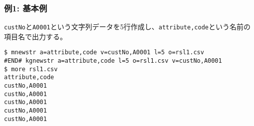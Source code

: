 \subsubsection*{例1: 基本例}

\verb|custNo|と\verb|A0001|という文字列データを5行作成し、\verb|attribute,code|という名前の項目名で出力する。


\begin{Verbatim}[baselinestretch=0.7,frame=single]
$ mnewstr a=attribute,code v=custNo,A0001 l=5 o=rsl1.csv
#END# kgnewstr a=attribute,code l=5 o=rsl1.csv v=custNo,A0001
$ more rsl1.csv
attribute,code
custNo,A0001
custNo,A0001
custNo,A0001
custNo,A0001
custNo,A0001
\end{Verbatim}
